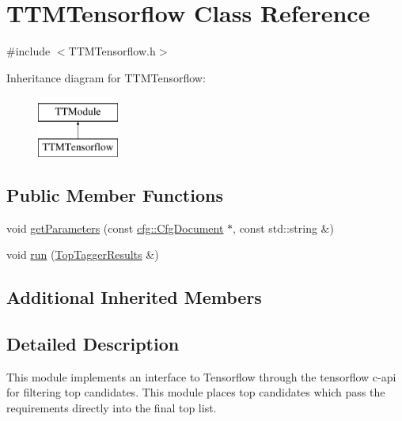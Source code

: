 \hypertarget{classTTMTensorflow}{\section{T\-T\-M\-Tensorflow Class Reference}
\label{classTTMTensorflow}
}


{\ttfamily \#include $<$T\-T\-M\-Tensorflow.\-h$>$}

Inheritance diagram for T\-T\-M\-Tensorflow\-:\begin{figure}[H]
\begin{center}
\leavevmode
\includegraphics[height=2.000000cm]{classTTMTensorflow}
\end{center}
\end{figure}
\subsection*{Public Member Functions}
\begin{DoxyCompactItemize}
\item 
void \hyperlink{classTTMTensorflow_ae8a95bbecd4a21698b64dc95e99f5f0f}{get\-Parameters} (const \hyperlink{classcfg_1_1CfgDocument}{cfg\-::\-Cfg\-Document} $\ast$, const std\-::string \&)
\item 
void \hyperlink{classTTMTensorflow_afe5cdab757948e8eb2713fab0385869b}{run} (\hyperlink{classTopTaggerResults}{Top\-Tagger\-Results} \&)
\end{DoxyCompactItemize}
\subsection*{Additional Inherited Members}


\subsection{Detailed Description}
This module implements an interface to Tensorflow through the tensorflow c-\/api for filtering top candidates. This module places top candidates which pass the requirements directly into the final top list.


